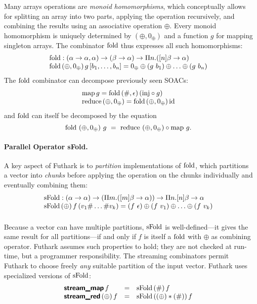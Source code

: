 Many arrays operations are \emph{monoid homomorphisms}, which
conceptually allows for splitting an array into two parts, applying
the operation recursively, and combining the results using an
associative operation $\oplus$.
%
Every monoid homomorphism is uniquely determined by
$(\oplus,0_{\oplus})$ and a function $g$ for mapping singleton
arrays. The combinator $\mathrm{fold}$ thus expresses all such homomorphisms:
\[ \begin{array}{l}
\mathrm{fold} : (\alpha \to \alpha, \alpha) \to (\beta \to \alpha) \to \Pi n. ([n]\beta \to \alpha) \\
\mathrm{fold} \,(\oplus, 0_{\oplus}) \,g\, [b_1, \ldots, b_n] = 0_{\oplus} \oplus (g~b_1) \oplus \ldots \oplus (g~b_n)
\end{array} \]
The $\mathrm{fold}$ combinator can decompose previously seen SOACs:
\[ \begin{array}{l}
\mathrm{map} \, g = \mathrm{fold}\, (\#, \epsilon)\, (\mathrm{inj} \circ g) \\
\mathrm{reduce}\, (\oplus, 0_{\oplus}) = \mathrm{fold}\, (\oplus, 0_{\oplus})\, \mathrm{id}
\end{array} \]
and $\mathrm{fold}$ can itself be decomposed by the equation
\[
  \mathrm{fold} ~ (\oplus,0_{\oplus}) ~ g ~ = ~ \mathrm{reduce} ~ (\oplus,0_{\oplus}) \circ \mathrm{map} ~ g.
\]


\paragraph{Parallel Operator sFold.}
A key aspect of Futhark is to \emph{partition} implementations of $\mathrm{fold}$,
which partitions a vector into \emph{chunks} before applying the operation
on the chunks individually and eventually combining them:
\[ \begin{array}{l}
\mathrm{sFold} : (\alpha \to \alpha) \to (\Pi m. ([m]\beta \to \alpha)) \to \Pi n. [n]\beta \to \alpha \\
\mathrm{sFold} \, (\oplus) \, f \, (v_1 \# \ldots \# v_k) = (f~\epsilon) \oplus (f~v_1) \oplus \ldots \oplus (f~v_k) \\[1em]
\end{array} \]
%
Because a vector can have multiple partitions, $\mathrm{sFold}$ is well-defined---it
gives the same result for all partitions---if and only if $f$ is itself a $\mathrm{fold}$
with $\oplus$ as combining operator.
%
Futhark assumes such properties to hold; they are not checked at run-time,
but a programmer responsibility.   The streaming combinators
permit Futhark to choose freely \emph{any} suitable partition of the input vector.
Futhark uses specialized versions of $\mathrm{sFold}$: %
\[ \begin{array}{lcl}
\mbox{\textsf{\bfseries{stream\_map}}}\, f & = &  \mathrm{sFold} \, (\#) \, f \\
\mbox{\textsf{\bfseries{stream\_red}}}\, (\oplus) \, f & = & \mathrm{sFold} \, ((\oplus) * (\#)) \, f
\end{array} \]

